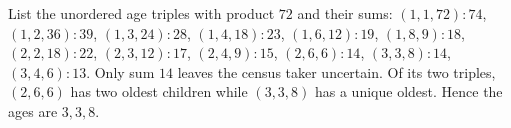 List the unordered age triples with product $72$ and their sums: $(1,1,72):74$, $(1,2,36):39$, $(1,3,24):28$, $(1,4,18):23$, $(1,6,12):19$, $(1,8,9):18$, $(2,2,18):22$, $(2,3,12):17$, $(2,4,9):15$, $(2,6,6):14$, $(3,3,8):14$, $(3,4,6):13$. Only sum $14$ leaves the census taker uncertain. Of its two triples, $(2,6,6)$ has two oldest children while $(3,3,8)$ has a unique oldest. Hence the ages are $\boxed{3,3,8}$.
